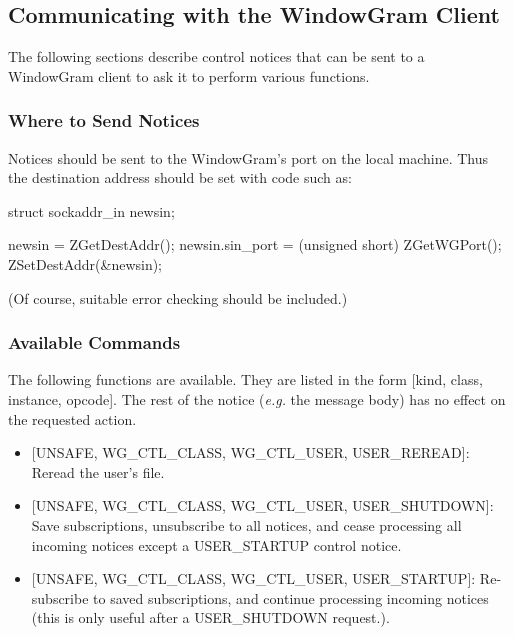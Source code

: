 %
\subsection{Communicating with the WindowGram Client}
\label{comm-zwgc}

The following sections describe control notices that can be
sent to a WindowGram client to ask it to perform various functions.

\subsubsection{Where to Send Notices}

Notices should be sent to the WindowGram's port on the local machine.
Thus the destination address should be set with code such as:

\begin{code}
    struct sockaddr_in newsin;

    newsin = ZGetDestAddr();
    newsin.sin_port = (unsigned short) ZGetWGPort();
    ZSetDestAddr(&newsin);
\end{code}
(Of course, suitable error checking should be included.)

\subsubsection{Available Commands}

The following functions are available.  They are listed in the form
[kind, class, instance, opcode].  The rest of the notice ({\em e.g.\/}
the message body) has no effect on the requested action.

\begin{itemize}
\item {[UNSAFE, WG_CTL_CLASS, WG_CTL_USER, USER_REREAD]}: Reread the
user's  file.
\item {[UNSAFE, WG_CTL_CLASS, WG_CTL_USER, USER_SHUTDOWN]}: Save
subscriptions, unsubscribe to all notices, and cease processing all
incoming notices except a USER_STARTUP control notice.
\item {[UNSAFE, WG_CTL_CLASS, WG_CTL_USER, USER_STARTUP]}: Re-subscribe
to saved subscriptions, and continue processing incoming notices (this
is only useful after a USER_SHUTDOWN request.).
\end{itemize}

